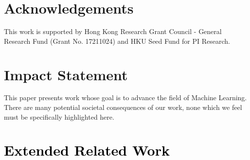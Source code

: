 \documentclass{article}
\newcommand{\modify}[1]{\textcolor{black}{#1}} %
\theoremstyle{plain}
\theoremstyle{definition}
\theoremstyle{remark}
\begin{document}
\section*{Acknowledgements}
This work is supported by Hong Kong Research Grant Council - General Research Fund (Grant No. 17211024) and HKU Seed Fund for PI Research.
\section*{Impact Statement}
This paper presents work whose goal is to advance the field of Machine Learning. There are many potential societal consequences of our work, none which we feel must be specifically highlighted here.




\newpage
\appendix
\onecolumn
\section{\modify{Extended Related Work}}

\end{document}
